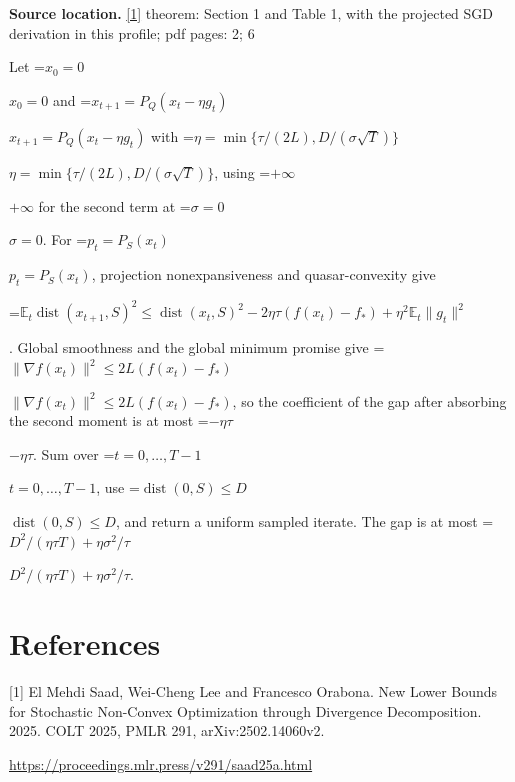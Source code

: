 \documentclass[10pt,a4paper]{article}
\newcommand{\AtlasMath}[1]{\par\begingroup\centering\setbox0=\hbox{$\displaystyle #1$}\ifdim\wd0>1.4\linewidth\typeout{ATLAS WIDE FORMULA: \the\wd0}\fi\ifdim\wd0>\linewidth\resizebox{\linewidth}{!}{\box0}\else\box0\fi\par\endgroup}
\newcommand{\AtlasInlineMath}[1]{\begingroup\setbox0=\hbox{$#1$}\ifdim\wd0>.4\linewidth\endgroup\AtlasMath{#1}\else\endgroup$#1$\fi}
\begin{document}
\textbf{Source location.} \href{https://proceedings.mlr.press/v291/saad25a.html}{[1]} theorem: Section 1 and Table 1, with the projected SGD derivation in this profile; pdf pages: 2; 6

Let \AtlasInlineMath{x_0=0} and \AtlasInlineMath{x_{t+1}=P_Q(x_t-\eta g_t)} with \AtlasInlineMath{\eta=\min\{\tau/(2L),D/(\sigma\sqrt{T})\}}, using \AtlasInlineMath{+\infty} for the second term at \AtlasInlineMath{\sigma=0}. For \AtlasInlineMath{p_t=P_S(x_t)}, projection nonexpansiveness and quasar-convexity give 
\AtlasMath{\mathbb E_t\operatorname{dist}(x_{t+1},S)^2\le\operatorname{dist}(x_t,S)^2-2\eta\tau(f(x_t)-f_*)+\eta^2\mathbb E_t\|g_t\|^2}
. Global smoothness and the global minimum promise give \AtlasInlineMath{\|\nabla f(x_t)\|^2\le2L(f(x_t)-f_*)}, so the coefficient of the gap after absorbing the second moment is at most \AtlasInlineMath{-\eta\tau}. Sum over \AtlasInlineMath{t=0,\dots,T-1}, use \AtlasInlineMath{\operatorname{dist}(0,S)\le D}, and return a uniform sampled iterate. The gap is at most \AtlasInlineMath{D^2/(\eta\tau T)+\eta\sigma^2/\tau}.

\section{References}
[1] El Mehdi Saad, Wei-Cheng Lee and Francesco Orabona. New Lower Bounds for Stochastic Non-Convex Optimization through Divergence Decomposition. 2025. COLT 2025, PMLR 291, arXiv:2502.14060v2.

\url{https://proceedings.mlr.press/v291/saad25a.html}
\end{document}
